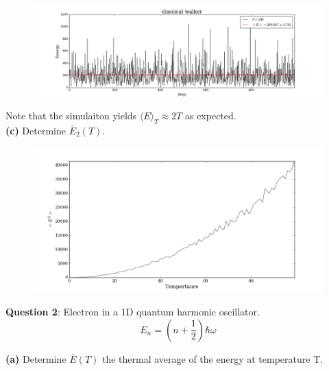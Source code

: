 \documentclass{article}
\begin{document}
\begin{figure}[H]
\begin{center}
\includegraphics[width=16cm]{../output/classical/walkers.png} 
\end{center}
\end{figure}

Note that the simulaiton yields $\langle E\rangle_{T} \approx 2T$ as expected. \\

\textbf{(c)} Determine $\bar{E}_{2}(T)$. 

\begin{figure}[H]
\begin{center}
\includegraphics[width=16cm]{../output/classical/expected_sq.png} 
\end{center}
\end{figure}


\bigskip
\textbf{Question 2}: Electron in a 1D quantum harmonic oscillator. 
	\[E_{n} = \left(n + \frac{1}{2} \right)\hbar\omega \]

\textbf{(a)} Determine $\bar{E}(T)$ the thermal average of the energy at temperature T. \\
\end{document}
